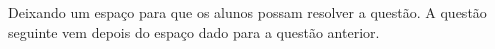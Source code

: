\documentclass[a4paper, 11pt, addpoints]{exam}
\begin{document}
\begin{questions}
		\question
		Deixando um espaço para que os alunos possam resolver a questão.
		\vspace{3cm} %
		\question
		A questão seguinte vem depois do espaço dado para a questão anterior.
\end{questions}
\end{document}
